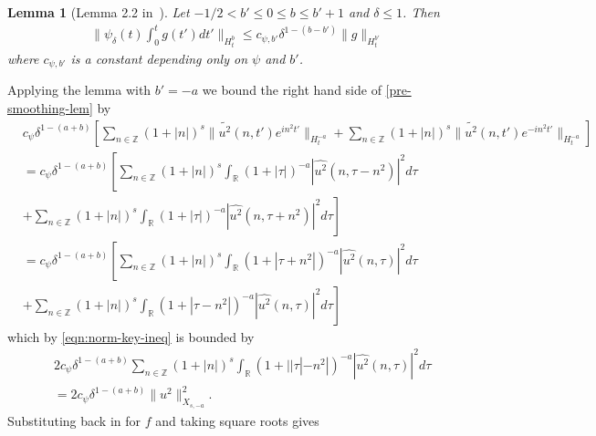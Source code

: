 \documentclass[12pt,reqno]{amsart}
\numberwithin{equation}{section}  %
\newcommand{\rr}{\mathbb{R}}
\newcommand{\zz}{\mathbb{Z}}
\newcommand{\wh}{\widehat}
\newcommand{\wt}{\widetilde}
\newtheorem{lemma}[theorem]{Lemma}
\begin{document}
\begin{appendices}
%
%
\begin{lemma}[Lemma 2.2 in~\cite{Farah:2009uq}]
Let $-1/2 < b' \le 0 \le b \le b' +1$ and $\delta \le 1$. Then
%
%
\begin{equation*}
\begin{split}
  \| \psi_{\delta}(t) \int_{0}^{t} g(t') dt' \|_{H^{b}_{t}} \le c_{\psi, b'}\delta^{1-(b - b')} \| g
  \|_{H_{t}^{b'}}
\end{split}
\end{equation*}
%
%
where $c_{\psi, b'}$ is a constant depending only on $\psi$ and $b'$.
\label{lem:pre-bilin-est}
\end{lemma}
%
%
%
%
%
%
Applying the lemma with $b' = -a$ we bound the right hand side
of \eqref{pre-smoothing-lem} by
%
%
\begin{equation*}
\begin{split}
  & c_{\psi} \delta^{1- (a + b)}\left[ \sum_{n \in \zz} (1 + |n|)^{s} \| \wt{u^{2}}(n, t')
  e^{in^{2}t'} \|_{H_{t}^{-a}}  +
  \sum_{n \in \zz} (1 + |n|)^{s} \| \wt{u^{2}}(n, t')
  e^{-in^{2}t'} \|_{H_{t}^{-a}} \right]
  \\
  & = c_{\psi} \delta^{1-(a + b)}
  \left [ \sum_{n \in \zz} (1 + |n|)^{s} \int_{\rr} (1 + | \tau
  |)^{-a} |\wh{u^{2}}(n, \tau - n^{2})|^{2} d \tau  \right .
  \\
  & + \left .
  \sum_{n \in \zz} (1 + |n|)^{s} \int_{\rr} (1 + | \tau
  |)^{-a} |\wh{u^{2}}(n, \tau + n^{2})|^{2} d \tau  \right ]
  \\
  & = c_{\psi} \delta^{1- (a + b)}
  \left [ \sum_{n \in \zz} (1 + |n|)^{s} \int_{\rr} (1 + | \tau
  + n^{2}
  |)^{-a} |\wh{u^{2}}(n, \tau )|^{2} d \tau  \right .
  \\
  & + \left . 
  \sum_{n \in \zz} (1 + |n|)^{s} \int_{\rr} (1 + | \tau
  - n^{2} |)^{-a} |\wh{u^{2}}(n, \tau )|^{2} d \tau  \right ]
\end{split}
\end{equation*}
%
%
which by \eqref{eqn:norm-key-ineq} is bounded by 
%
%
%
\begin{equation*}
\begin{split}
  & 
  2 c_{\psi} \delta^{1- (a + b)}
\sum_{n \in \zz} (1 + |n|)^{s} \int_{\rr} (1 + | |\tau|
  - n^{2} |)^{-a} 
|\wh{u^{2}}(n, \tau)|^{2} d \tau 
  \\
  & = 2 c_{\psi} \delta^{1- (a + b)}
\|u^{2} \|_{X_{s,-a}}^{2}.
\end{split}
\end{equation*}
%
%
Substituting back in for $f$ and taking square roots gives
%
%
\begin{equation}

\end{equation}
\end{appendices}
\end{document}
